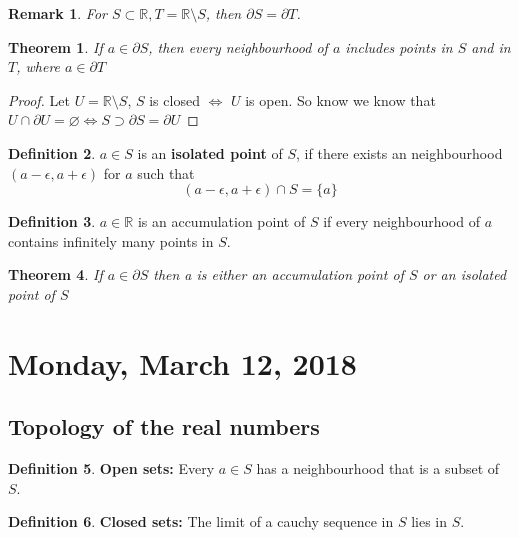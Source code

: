 \documentclass[12pt]{article}
\theoremstyle{plain}
\newtheorem*{remark}{Remark}
\newtheorem{theorem}{Theorem}[section]
\theoremstyle{definition}
\newtheorem{definition}[theorem]{Definition}
\begin{document}
\begin{remark}
	For $S \subset \mathbb{R}, T=\mathbb{R} \setminus S$, then $\partial S = \partial T$.
\end{remark}

\begin{theorem}
	If $a\in \partial S$, then every neighbourhood of $a$ includes points in $S$ and in $T$, where $a\in\partial T$
\end{theorem}

\begin{proof}
	Let $U = \mathbb{R} \setminus S$, $S$ is closed $\Longleftrightarrow$ $U$ is open. So know we know that $U \cap \partial U = \varnothing \Longleftrightarrow S \supset \partial S = \partial U$
\end{proof}

\begin{definition}
	$a\in S$ is an \textbf{isolated point} of $S$, if there exists an neighbourhood $(a-\epsilon, a+\epsilon)$ for $a$ such that $$(a-\epsilon, a+\epsilon) \cap S = \{ a \}$$
\end{definition}

\begin{definition}
	$a\in\mathbb{R}$ is an accumulation point of $S$ if every neighbourhood of $a$ contains infinitely many points in $S$.
\end{definition}

\begin{theorem}
	If $a\in \partial S$ then a is either an accumulation point of $S$ or an isolated point of $S$
\end{theorem}


\newpage

\section{Monday, March 12, 2018}

\subsection{Topology of the real numbers}

\begin{definition}
	\textbf{Open sets:} Every $a\in S$ has a neighbourhood that is a subset of $S$.
\end{definition}

\begin{definition}
	\textbf{Closed sets:} The limit of a cauchy sequence in $S$ lies in $S$.
\end{definition}
\end{document}

